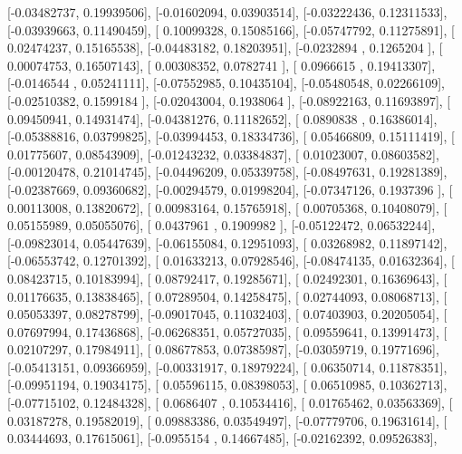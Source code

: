 \documentclass{article}
\begin{document}
       [-0.03482737,  0.19939506],
       [-0.01602094,  0.03903514],
       [-0.03222436,  0.12311533],
       [-0.03939663,  0.11490459],
       [ 0.10099328,  0.15085166],
       [-0.05747792,  0.11275891],
       [ 0.02474237,  0.15165538],
       [-0.04483182,  0.18203951],
       [-0.0232894 ,  0.1265204 ],
       [ 0.00074753,  0.16507143],
       [ 0.00308352,  0.0782741 ],
       [ 0.0966615 ,  0.19413307],
       [-0.0146544 ,  0.05241111],
       [-0.07552985,  0.10435104],
       [-0.05480548,  0.02266109],
       [-0.02510382,  0.1599184 ],
       [-0.02043004,  0.1938064 ],
       [-0.08922163,  0.11693897],
       [ 0.09450941,  0.14931474],
       [-0.04381276,  0.11182652],
       [ 0.0890838 ,  0.16386014],
       [-0.05388816,  0.03799825],
       [-0.03994453,  0.18334736],
       [ 0.05466809,  0.15111419],
       [ 0.01775607,  0.08543909],
       [-0.01243232,  0.03384837],
       [ 0.01023007,  0.08603582],
       [-0.00120478,  0.21014745],
       [-0.04496209,  0.05339758],
       [-0.08497631,  0.19281389],
       [-0.02387669,  0.09360682],
       [-0.00294579,  0.01998204],
       [-0.07347126,  0.1937396 ],
       [ 0.00113008,  0.13820672],
       [ 0.00983164,  0.15765918],
       [ 0.00705368,  0.10408079],
       [ 0.05155989,  0.05055076],
       [ 0.0437961 ,  0.1909982 ],
       [-0.05122472,  0.06532244],
       [-0.09823014,  0.05447639],
       [-0.06155084,  0.12951093],
       [ 0.03268982,  0.11897142],
       [-0.06553742,  0.12701392],
       [ 0.01633213,  0.07928546],
       [-0.08474135,  0.01632364],
       [ 0.08423715,  0.10183994],
       [ 0.08792417,  0.19285671],
       [ 0.02492301,  0.16369643],
       [ 0.01176635,  0.13838465],
       [ 0.07289504,  0.14258475],
       [ 0.02744093,  0.08068713],
       [ 0.05053397,  0.08278799],
       [-0.09017045,  0.11032403],
       [ 0.07403903,  0.20205054],
       [ 0.07697994,  0.17436868],
       [-0.06268351,  0.05727035],
       [ 0.09559641,  0.13991473],
       [ 0.02107297,  0.17984911],
       [ 0.08677853,  0.07385987],
       [-0.03059719,  0.19771696],
       [-0.05413151,  0.09366959],
       [-0.00331917,  0.18979224],
       [ 0.06350714,  0.11878351],
       [-0.09951194,  0.19034175],
       [ 0.05596115,  0.08398053],
       [ 0.06510985,  0.10362713],
       [-0.07715102,  0.12484328],
       [ 0.0686407 ,  0.10534416],
       [ 0.01765462,  0.03563369],
       [ 0.03187278,  0.19582019],
       [ 0.09883386,  0.03549497],
       [-0.07779706,  0.19631614],
       [ 0.03444693,  0.17615061],
       [-0.0955154 ,  0.14667485],
       [-0.02162392,  0.09526383],
\end{document}

